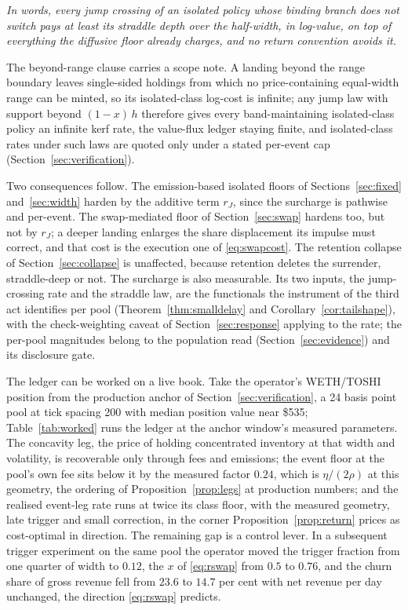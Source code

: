 \documentclass[11pt,a4paper]{article}
\theoremstyle{definition}
\theoremstyle{plain}
\theoremstyle{remark}
\begin{document}
\emph{In words, every jump crossing of an isolated policy whose binding branch does not switch pays at least its straddle depth over the half-width, in log-value, on top of everything 
the diffusive floor already charges, and no return convention avoids it.}

The beyond-range clause carries a scope note. A landing beyond the range boundary leaves single-sided holdings from which no price-containing equal-width range can be minted, so its 
isolated-class log-cost is infinite; any jump law with support beyond $(1-x)\,h$ therefore gives every band-maintaining isolated-class policy an infinite kerf rate, the value-flux ledger 
staying finite, and isolated-class rates under such laws are quoted only under a stated per-event cap (Section~\ref{sec:verification}).

Two consequences follow. The emission-based isolated floors of Sections~\ref{sec:fixed} and~\ref{sec:width} harden by the additive term $r_J$, since the surcharge is pathwise and 
per-event. The swap-mediated floor of Section~\ref{sec:swap} hardens too, but not by $r_J$; a deeper landing enlarges the share displacement its impulse must correct, and that cost 
is the execution one of \eqref{eq:swapcost}. The retention collapse of Section~\ref{sec:collapse} is unaffected, because retention deletes the surrender, straddle-deep or not. 
The surcharge is also measurable. Its two inputs, the jump-crossing rate and the straddle law, are the functionals the instrument of the third act identifies per 
pool (Theorem~\ref{thm:smalldelay} and Corollary~\ref{cor:tailshape}), with the check-weighting caveat of Section~\ref{sec:response} applying to the rate; the per-pool magnitudes 
belong to the population read (Section~\ref{sec:evidence}) and its disclosure gate.

The ledger can be worked on a live book. Take the operator's WETH/TOSHI position from the production anchor of Section~\ref{sec:verification}, a 24 basis point pool at tick spacing 
200 with median position value near \$535; Table~\ref{tab:worked} runs the ledger at the anchor window's measured parameters. The concavity leg, the price of holding 
concentrated inventory at that width and volatility, is recoverable only through fees and emissions; the event floor at the pool's own fee sits below it by the measured 
factor $0.24$, which is $\eta/(2\rho)$ at this geometry, the ordering of Proposition~\ref{prop:legs} at production numbers; and the realised event-leg rate runs at twice its 
class floor, with the measured geometry, late trigger and small correction, in the corner Proposition~\ref{prop:return} prices as cost-optimal in direction. The remaining gap 
is a control lever. In a subsequent trigger experiment on the same pool the operator moved the trigger fraction from one quarter of width to $0.12$, the $x$ of \eqref{eq:rswap} 
from $0.5$ to $0.76$, and the churn share of gross revenue fell from $23.6$ to $14.7$ per cent with net revenue per day unchanged, the direction \eqref{eq:rswap} predicts.
\end{document}
